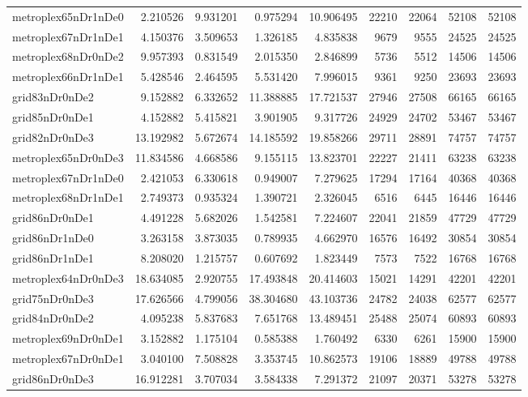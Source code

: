 \begin{longtable}{|l|r|r|r|r|r|r|r|r|}
metroplex65nDr1nDe0 & 2.210526 & 9.931201 & 0.975294 & 10.906495 & 22210 & 22064 & 52108 & 52108 \\
metroplex67nDr1nDe1 & 4.150376 & 3.509653 & 1.326185 & 4.835838 & 9679 & 9555 & 24525 & 24525 \\
metroplex68nDr0nDe2 & 9.957393 & 0.831549 & 2.015350 & 2.846899 & 5736 & 5512 & 14506 & 14506 \\
metroplex66nDr1nDe1 & 5.428546 & 2.464595 & 5.531420 & 7.996015 & 9361 & 9250 & 23693 & 23693 \\
grid83nDr0nDe2 & 9.152882 & 6.332652 & 11.388885 & 17.721537 & 27946 & 27508 & 66165 & 66165 \\
grid85nDr0nDe1 & 4.152882 & 5.415821 & 3.901905 & 9.317726 & 24929 & 24702 & 53467 & 53467 \\
grid82nDr0nDe3 & 13.192982 & 5.672674 & 14.185592 & 19.858266 & 29711 & 28891 & 74757 & 74757 \\
metroplex65nDr0nDe3 & 11.834586 & 4.668586 & 9.155115 & 13.823701 & 22227 & 21411 & 63238 & 63238 \\
metroplex67nDr1nDe0 & 2.421053 & 6.330618 & 0.949007 & 7.279625 & 17294 & 17164 & 40368 & 40368 \\
metroplex68nDr1nDe1 & 2.749373 & 0.935324 & 1.390721 & 2.326045 & 6516 & 6445 & 16446 & 16446 \\
grid86nDr0nDe1 & 4.491228 & 5.682026 & 1.542581 & 7.224607 & 22041 & 21859 & 47729 & 47729 \\
grid86nDr1nDe0 & 3.263158 & 3.873035 & 0.789935 & 4.662970 & 16576 & 16492 & 30854 & 30854 \\
grid86nDr1nDe1 & 8.208020 & 1.215757 & 0.607692 & 1.823449 & 7573 & 7522 & 16768 & 16768 \\
metroplex64nDr0nDe3 & 18.634085 & 2.920755 & 17.493848 & 20.414603 & 15021 & 14291 & 42201 & 42201 \\
grid75nDr0nDe3 & 17.626566 & 4.799056 & 38.304680 & 43.103736 & 24782 & 24038 & 62577 & 62577 \\
grid84nDr0nDe2 & 4.095238 & 5.837683 & 7.651768 & 13.489451 & 25488 & 25074 & 60893 & 60893 \\
metroplex69nDr0nDe1 & 3.152882 & 1.175104 & 0.585388 & 1.760492 & 6330 & 6261 & 15900 & 15900 \\
metroplex67nDr0nDe1 & 3.040100 & 7.508828 & 3.353745 & 10.862573 & 19106 & 18889 & 49788 & 49788 \\
grid86nDr0nDe3 & 16.912281 & 3.707034 & 3.584338 & 7.291372 & 21097 & 20371 & 53278 & 53278 \\

\end{longtable}
